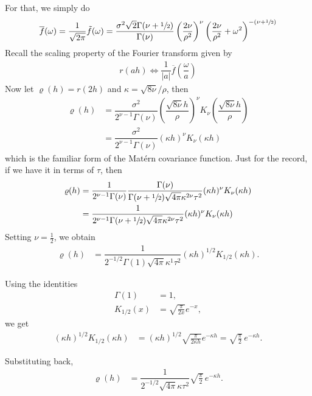 \documentclass[11pt,a4paper]{article}
\theoremstyle{plain}
\theoremstyle{definition}
\begin{document}
For that, we simply do
\begin{align}
   \overline{f}(\omega) = \dfrac{1}{\sqrt{2\pi}} \tilde{f}(\omega)  = \dfrac{\sigma^2\sqrt{2}\Gamma(\nu+\sfrac{1}{2})}{\Gamma(\nu)}\left(\dfrac{2\nu}{\rho^2}\right)^\nu \left(\dfrac{2\nu}{\rho^2}+\omega^2\right)^{-(\nu+\sfrac{1}{2})}
\end{align}
Recall the scaling property of the Fourier transform given by 
\begin{align}
    r(ah)\iff \dfrac{1}{|a|}\overline{f}\left(\dfrac{\omega}{a}\right)
\end{align}
Now let $\varrho(h) = r(2h)$ and $\kappa = \sqrt{8\nu}/\rho$, then
\begin{align}
    \varrho(h) & = \dfrac{\sigma^2}{2^{\nu-1}\Gamma(\nu)}\left(\dfrac{\sqrt{8\nu}h}{\rho}\right)^\nu K_\nu\left(\dfrac{\sqrt{8\nu}h}{\rho}\right)\\
    & = \dfrac{\sigma^2}{2^{\nu-1}\Gamma(\nu)}(\kappa h)^\nu K_\nu(\kappa h)
\end{align}
which is the familiar form of the Matérn covariance function.
Just for the record, if we have it in terms of $\tau$, then 
\begin{align}
    \varrho(h) & = \dfrac{1}{2^{\nu-1}\Gamma(\nu)} \dfrac{\Gamma(\nu)}{\Gamma(\nu+\sfrac{1}{2})\sqrt{4\pi}\kappa^{2\nu}\tau^2}(\kappa h)^\nu K_\nu(\kappa h)\\
    & = \dfrac{1}{2^{\nu-1}\Gamma(\nu+\sfrac{1}{2})\sqrt{4\pi}\kappa^{2\nu}\tau^2}(\kappa h)^\nu K_\nu(\kappa h)
\end{align}
Setting $\nu = \tfrac{1}{2}$, we obtain
\begin{align}
\varrho(h)
&=
\dfrac{1}{2^{-1/2}\Gamma(1)\sqrt{4\pi}\kappa^{1}\tau^2}
(\kappa h)^{1/2} K_{1/2}(\kappa h).
\end{align}

Using the identities
\begin{align}
\Gamma(1) &= 1, \\
K_{1/2}(x) &= \sqrt{\frac{\pi}{2x}} e^{-x},
\end{align}
we get
\begin{align}
(\kappa h)^{1/2} K_{1/2}(\kappa h)
&=
(\kappa h)^{1/2}
\sqrt{\frac{\pi}{2\kappa h}}
e^{-\kappa h}
=
\sqrt{\frac{\pi}{2}}\, e^{-\kappa h}.
\end{align}

Substituting back,
\begin{align}
\varrho(h)
&=
\dfrac{1}{2^{-1/2}\sqrt{4\pi}\kappa\tau^2}
\sqrt{\frac{\pi}{2}}\, e^{-\kappa h}.
\end{align}
\end{document}
